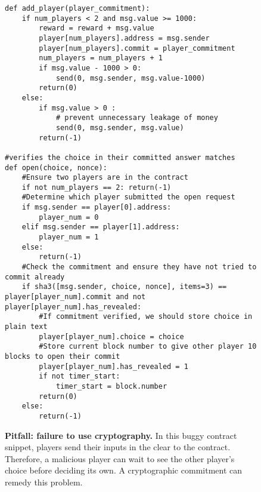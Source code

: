 \documentclass[10pt,twocolumn,letterpaper]{article}
\newcommand{\elaine}[1]{{\color{red}{[elaine: #1]}}}
\begin{document}

\elaine{in figures, can we put in framed boxes the lines
that have problems.}

\begin{figure}
\begin{mdframed}
\begin{verbatim}
def add_player(player_commitment):
	if num_players < 2 and msg.value >= 1000:
		reward = reward + msg.value
		player[num_players].address = msg.sender
		player[num_players].commit = player_commitment
		num_players = num_players + 1
		if msg.value - 1000 > 0:
			send(0, msg.sender, msg.value-1000)
		return(0)
	else:	
		if msg.value > 0 :
			# prevent unnecessary leakage of money
			send(0, msg.sender, msg.value)
		return(-1)
		
#verifies the choice in their committed answer matches
def open(choice, nonce):
	#Ensure two players are in the contract
	if not num_players == 2: return(-1)
	#Determine which player submitted the open request
	if msg.sender == player[0].address:
		player_num = 0
	elif msg.sender == player[1].address:
		player_num = 1
	else:
		return(-1)
	#Check the commitment and ensure they have not tried to commit already
	if sha3([msg.sender, choice, nonce], items=3) == player[player_num].commit and not player[player_num].has_revealed:
		#If commitment verified, we should store choice in plain text
		player[player_num].choice = choice
		#Store current block number to give other player 10 blocks to open their commit
		player[player_num].has_revealed = 1		
		if not timer_start:
			timer_start = block.number
		return(0)
	else:
		return(-1)
\end{verbatim}
\end{mdframed}
\caption{
\label{fig:nocrypto}
{\bf Pitfall: failure to use cryptography.}
In this buggy contract snippet, players send their inputs 
in the clear to the contract. Therefore, a malicious player 
can wait to see the other player's 
choice before deciding its own.
A cryptographic commitment can remedy this problem.
}
\end{figure}
\end{document}
